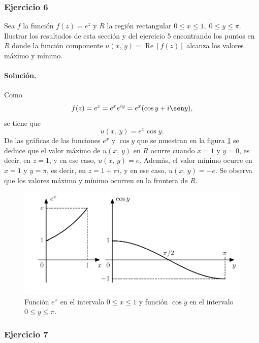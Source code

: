 \documentclass[a4paper]{report}
\renewcommand{\Re}{\operatorname{Re}}
\begin{document}
\subsubsection{Ejercicio 6}

Sea \(f\) la función \(f(z)=e^z\) y \(R\) la región rectangular \(0\leq x\leq 1,\;0\leq y\leq\pi\). Ilustrar los resultados de esta sección y del ejercicio 5 encontrando los puntos en \(R\) donde la función componente \(u(x,\,y)=\Re[f(z)]\) alcanza los valores máximo y mínimo.

\paragraph{Solución.} Como
\[
 f(z)=e^z=e^xe^{iy}=e^x(\cos y+i\sen y),
\]
se tiene que 
\[
 u(x,\,y)=e^x\cos y.
\]
De las gráficas de las funciones \(e^x\) y \(\cos y\) que se muestran en la figura \ref{fig:exercise_59_06_graphs} se deduce que el valor máximo de \(u(x,\,y)\) en \(R\) ocurre cuando \(x=1\) y \(y=0\), es decir, en \(z=1\), y en ese caso, \(u(x,\,y)=e\). Además, el valor mínimo ocurre en \(x=1\) y \(y=\pi\), es decir, en \(z=1+\pi i\), y en ese caso, \(u(x,\,y)=-e\). Se observa que los valores máximo y mínimo ocurren en la frontera de \(R\).
\begin{figure}[!htb]
  \begin{minipage}[c]{0.7\textwidth}
    \includegraphics[width=\textwidth]{figuras/exercise_59_06_graphs.pdf}
  \end{minipage}\hfill
  \begin{minipage}[c]{0.2\textwidth}
    \caption{
       Función \(e^x\) en el intervalo  \(0\leq x\leq1\) y función \(\cos y\) en el intervalo \(0\leq y\leq\pi\).
    }\label{fig:exercise_59_06_graphs}
  \end{minipage}
\end{figure}

\subsubsection{Ejercicio 7}
\end{document}
